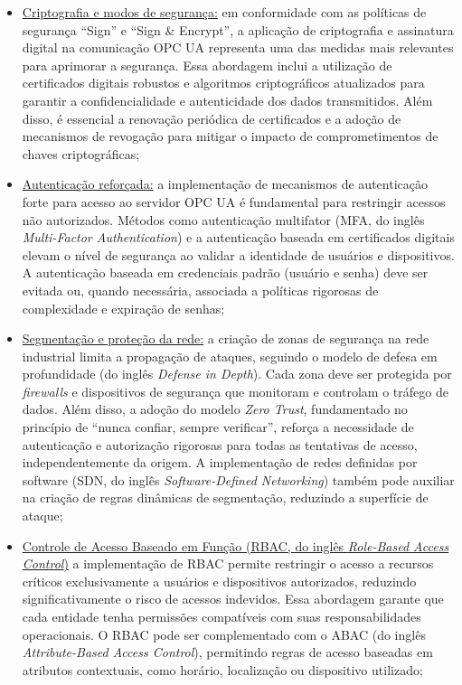         \begin{itemize}
            \item \underline{Criptografia e modos de segurança:} em conformidade com as políticas de segurança ``Sign'' e ``Sign \& Encrypt'', a aplicação de criptografia e assinatura digital na comunicação OPC UA representa uma das medidas mais relevantes para aprimorar a segurança. Essa abordagem inclui a utilização de certificados digitais robustos e algoritmos criptográficos atualizados para garantir a confidencialidade e autenticidade dos dados transmitidos. Além disso, é essencial a renovação periódica de certificados e a adoção de mecanismos de revogação para mitigar o impacto de comprometimentos de chaves criptográficas;
            \item \underline{Autenticação reforçada:} a implementação de mecanismos de autenticação forte para acesso ao servidor OPC UA é fundamental para restringir acessos não autorizados. Métodos como autenticação multifator (MFA, do inglês \textit{Multi-Factor Authentication}) e a autenticação baseada em certificados digitais elevam o nível de segurança ao validar a identidade de usuários e dispositivos. A autenticação baseada em credenciais padrão (usuário e senha) deve ser evitada ou, quando necessária, associada a políticas rigorosas de complexidade e expiração de senhas;
            \item \underline{Segmentação e proteção da rede:} a criação de zonas de segurança na rede industrial limita a propagação de ataques, seguindo o modelo de defesa em profundidade (do inglês \textit{Defense in Depth}). Cada zona deve ser protegida por \textit{firewalls} e dispositivos de segurança que monitoram e controlam o tráfego de dados. Além disso, a adoção do modelo \textit{Zero Trust}, fundamentado no princípio de ``nunca confiar, sempre verificar'', reforça a necessidade de autenticação e autorização rigorosas para todas as tentativas de acesso, independentemente da origem. A implementação de redes definidas por software (SDN, do inglês \textit{Software-Defined Networking}) também pode auxiliar na criação de regras dinâmicas de segmentação, reduzindo a superfície de ataque;
            \item \underline{Controle de Acesso Baseado em Função (RBAC, do inglês \textit{Role-Based Access Control})} a implementação de RBAC permite restringir o acesso a recursos críticos exclusivamente a usuários e dispositivos autorizados, reduzindo significativamente o risco de acessos indevidos. Essa abordagem garante que cada entidade tenha permissões compatíveis com suas responsabilidades operacionais. O RBAC pode ser complementado com o ABAC (do inglês \textit{Attribute-Based Access Control}), permitindo regras de acesso baseadas em atributos contextuais, como horário, localização ou dispositivo utilizado;

\end{itemize}
